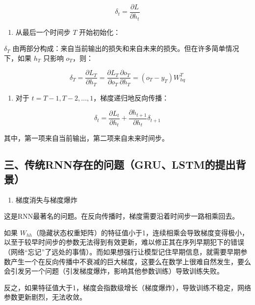 \[
\delta_t = \frac{\partial L}{\partial h_t}
\]

\begin{enumerate}
\def\labelenumi{\arabic{enumi}.}
\tightlist
\item
  从最后一个时间步 \(T\) 开始初始化：
\end{enumerate}

\(\delta_T\) 由两部分构成：来自当前输出的损失和来自未来的损失。但在许多简单情况下，如果 \(h_T\) 只影响 \(o_T\)，则：

\[
\delta_T = \frac{\partial L_T}{\partial h_T}
= \frac{\partial L_T}{\partial o_T}\frac{\partial o_T}{\partial h_T}
= (o_T - y_T) W_{hq}^T
\]

\begin{enumerate}
\def\labelenumi{\arabic{enumi}.}
\setcounter{enumi}{1}
\tightlist
\item
  对于 \(t = T-1, T-2, \ldots, 1\)，梯度递归地反向传播：
\end{enumerate}

\[
\delta_t = \frac{\partial L_t}{\partial h_t} + \frac{\partial h_{t+1}}{\partial h_t}\delta_{t+1}
\]

其中，第一项来自当前输出，第二项来自未来时间步。

\hypertarget{ux4e09ux4f20ux7edfrnnux5b58ux5728ux7684ux95eeux9898grulstmux7684ux63d0ux51faux80ccux666f}{%
\subsection{三、传统RNN存在的问题（GRU、LSTM的提出背景）}\label{ux4e09ux4f20ux7edfrnnux5b58ux5728ux7684ux95eeux9898grulstmux7684ux63d0ux51faux80ccux666f}}

\begin{enumerate}
\def\labelenumi{\arabic{enumi}.}
\tightlist
\item
  梯度消失与梯度爆炸
\end{enumerate}

这是RNN最著名的问题。在反向传播时，梯度需要沿着时间步一路相乘回去。

如果 \(W_{hh}\)（隐藏状态权重矩阵）的特征值小于1，连续相乘会导致梯度变得极小，以至于较早时间步的参数无法得到有效更新，难以修正其在序列早期犯下的错误（网络``忘记''了远处的事情）。而如果想强行让模型记住早期信息，就需要早期参数产生一个在反向传播中不衰减的巨大梯度，这要么在数学上很难自然发生，要么会引发另一个问题（引发梯度爆炸，影响其他参数训练）导致训练失败。

反之，如果特征值大于1，梯度会指数级增长（梯度爆炸），导致训练不稳定，网络参数更新剧烈，无法收敛。

